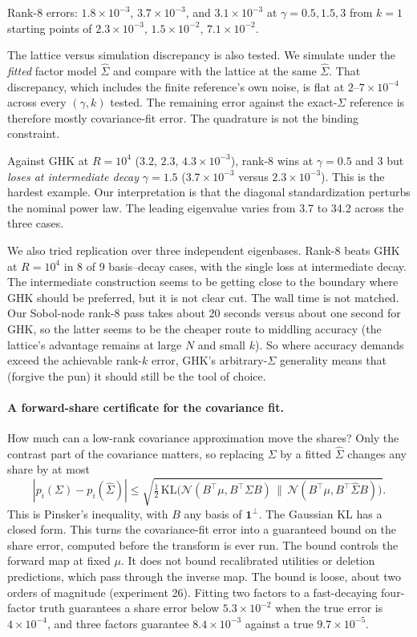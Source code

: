 \documentclass[12pt]{article}
\theoremstyle{remark}
\begin{document}
Rank-8 errors: $1.8\times10^{-3}$, $3.7\times10^{-3}$, and
$3.1\times10^{-3}$ at $\gamma = 0.5, 1.5, 3$ from $k=1$ starting points of
$2.3\times10^{-3}$, $1.5\times10^{-2}$, $7.1\times10^{-2}$.

The lattice versus simulation discrepancy is also tested. We simulate
under the \emph{fitted} factor model $\hat\Sigma$ and compare with the
lattice at the same $\hat\Sigma$. That discrepancy, which includes the
finite reference's own noise, is flat at $2$--$7\times10^{-4}$ across
every $(\gamma, k)$ tested. The remaining error against the
exact-$\Sigma$ reference is therefore mostly covariance-fit error. The
quadrature is not the binding constraint. 

Against GHK at $R = 10^4$
($3.2$, $2.3$, $4.3\times10^{-3}$), rank-8 wins at $\gamma = 0.5$ and $3$
but \emph{loses at intermediate decay} $\gamma = 1.5$
($3.7\times10^{-3}$ versus $2.3\times10^{-3}$). This is the hardest example. 
Our interpretation is that the diagonal standardization 
perturbs the nominal power law. The leading eigenvalue varies from 3.7 to 34.2
across the three cases. 

We also tried replication over three independent eigenbases. Rank-8 beats GHK at $R=10^4$
in 8 of 9 basis--decay cases, with the single loss at intermediate decay.
The intermediate construction seems to be getting close to the boundary where  GHK should be preferred, but 
it is not clear cut. The wall time is not matched. Our Sobol-node
rank-8 pass takes about 20 seconds versus
about one second for GHK, so the latter seems to be the cheaper route to middling accuracy (the lattice's advantage remains at large $N$ and small
$k$). So where accuracy demands exceed the achievable rank-$k$
error, GHK's arbitrary-$\Sigma$ generality means that (forgive the pun) it should still be the tool of choice.  

\paragraph{A forward-share certificate for the covariance fit.} How much can a low-rank
covariance approximation move the shares? Only the contrast part of the
covariance matters, so replacing $\Sigma$ by a fitted $\hat\Sigma$
changes any share by at most
\[
|p_i(\Sigma) - p_i(\hat\Sigma)| \le
\sqrt{\tfrac12\,\mathrm{KL}\big(\mathcal{N}(B^\top\mu, B^\top\Sigma B)\,\|\,
\mathcal{N}(B^\top\mu, B^\top\hat\Sigma B)\big)}.
\]
This is Pinsker's inequality, with $B$ any basis of $\mathbf{1}^\perp$.
The Gaussian KL has a closed form. This turns the covariance-fit error into a
guaranteed bound on the share error, computed before the transform is
ever run. The bound controls the forward map at fixed $\mu$. It does
not bound recalibrated utilities or deletion predictions, which pass
through the inverse map. The bound is loose, about two orders of magnitude (experiment 26).
Fitting two factors to a fast-decaying four-factor truth guarantees a
share error below $5.3\times10^{-2}$ when the true error is
$4\times10^{-4}$, and three factors guarantee $8.4\times10^{-3}$
against a true $9.7\times10^{-5}$.
\end{document}
